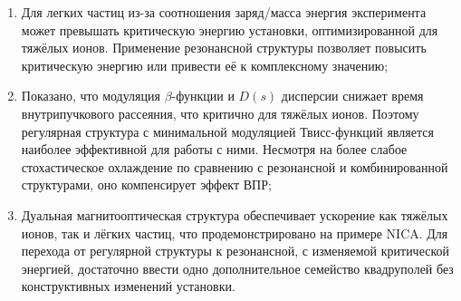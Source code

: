 \begin{enumerate}

\item  Для легких частиц из-за соотношения заряд/масса энергия эксперимента может превышать критическую энергию установки, оптимизированной для тяжёлых ионов. Применение резонансной структуры позволяет повысить критическую энергию или привести её к комплексному значению;

\item Показано, что модуляция $\beta$-функции и $D(s)$ дисперсии снижает время внутрипучкового рассеяния, что критично для тяжёлых ионов. Поэтому регулярная структура с минимальной модуляцией Твисс-функций является наиболее эффективной для работы с ними. Несмотря на более слабое стохастическое охлаждение по сравнению с резонансной и комбинированной структурами, оно компенсирует эффект ВПР;

\item Дуальная магнитооптическая структура обеспечивает ускорение как тяжёлых ионов, так и лёгких частиц, что продемонстрировано на примере NICA. Для перехода от регулярной структуры к резонансной, с изменяемой критической энергией, достаточно ввести одно дополнительное семейство квадруполей без конструктивных изменений установки.

\end{enumerate}

\FloatBarrier
